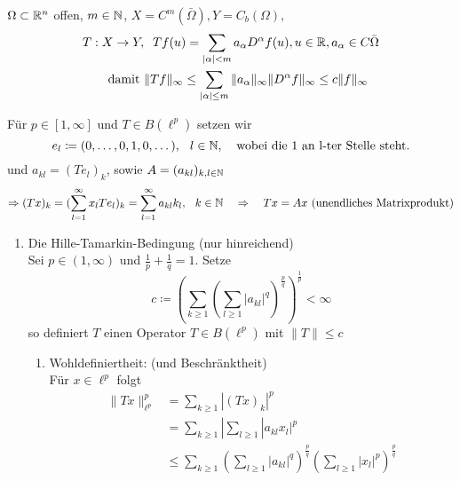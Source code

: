 \begin{beispiel}[Differentialoperatoren] 
	$\Omega \subset \mathbb{R}^n$ offen, $m \in \mathbb{N}$, $X = C^{m}(\bar \Omega), Y = C_{b}(\Omega),$
	\begin{align*}
		T:X \rightarrow Y, & \hspace{0.25cm} Tf(u) = \sum_{|\alpha| < m} a_{\alpha} D^{\alpha} f(u), u \in \mathbb{R}, a_{\alpha} \in C{\bar \Omega} \\
  		\text{damit } & \| Tf \|_{\infty} \leq \sum_{|\alpha| \leq m} \| a_{\alpha} \|_{\infty} \| D^{\alpha} f \|_{\infty} \leq c \|f\|_{\infty}	
  	\end{align*}
\end{beispiel}

\begin{beispiel}[Matrizenmultiplikation] 
	Für $p \in [1, \infty]$ und $T \in B(\ell^{p})$ setzen wir 
	\[ e_{l} \coloneqq (0, \dotsc, 0, 1, 0, \dotsc), \hspace{0.25cm} l \in \mathbb{N}, \hspace{0.25cm} \text{ wobei die 1 an l-ter Stelle steht.} \]
	und $a_{kl} = (T e_{l})_{k}$, sowie $A = (a_{kl})_{k,l \in \mathbb{N}}$
	\[ \Rightarrow (Tx)_{k} = (\sum_{l = 1}^{\infty} x_{l} T e_{l})_{k} = \sum_{ l = 1}^{\infty} a_{kl}k_{l}, \hspace{0.25cm} k \in \mathbb{N} \quad \Rightarrow \quad T x = A x \text{ (unendliches Matrixprodukt)} \]
	\begin{enumerate}[label=\alph*\upshape)]
		\item Die Hille-Tamarkin-Bedingung (nur hinreichend) \\
			Sei $p \in (1, \infty)$ und $\frac{1}{p} + \frac{1}{q} = 1$. Setze
			\[ c \coloneqq \left( \sum_{k \geq 1} \left( \sum_{l \geq 1} |a_{kl}|^{q} \right)^{\frac{p}{q}} \right)^{\frac{1}{p}} < \infty \]
			so definiert $T$ einen Operator $T \in B(\ell^{p})$ mit $\| T \| \leq c$ 
		\begin{beweis}
			\begin{enumerate}
				\item Wohldefiniertheit: (und Beschränktheit)  \\
					Für $x \in \ell^{p}$ folgt
					\begin{align*}
						\| Tx \|_{\ell^{p}}^{p} &= \sum_{k \geq 1} | (Tx)_{k} |^{p} \\
									 	 &= \sum_{k \geq 1} | \sum_{l \geq 1} |a_{kl} x_{l} |^{p} \\
										 &\leq \sum_{k \geq 1} \left( \sum_{l \geq 1} |a_{kl}|^{q} \right)^{\frac{p}{q}} \left( \sum_{l \geq 1} |x_{l}|^{p} \right)^{\frac{p}{q}} \\

\end{align*}
\end{enumerate}
\end{beweis}
\end{enumerate}
\end{beispiel}
